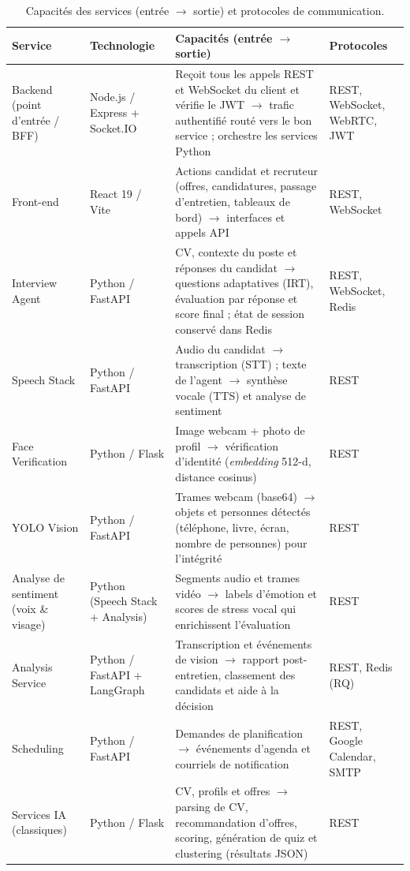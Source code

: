 \begin{table}[H]
  \centering
  \footnotesize
  \setlength{\tabcolsep}{4pt}
  \renewcommand{\arraystretch}{1.35}
  \begin{tabularx}{\textwidth}{|>{\raggedright\arraybackslash}p{2.3cm}|>{\raggedright\arraybackslash}p{2.4cm}|>{\raggedright\arraybackslash}X|>{\raggedright\arraybackslash}p{2.2cm}|}
    \hline
    \textbf{Service} & \textbf{Technologie} & \textbf{Capacités (entrée $\rightarrow$ sortie)} & \textbf{Protocoles} \\
    \hline
    Backend (point d'entrée / BFF) & Node.js / Express + Socket.IO & Reçoit tous les appels REST et WebSocket du client et vérifie le JWT $\rightarrow$ trafic authentifié routé vers le bon service ; orchestre les services Python & REST, WebSocket, WebRTC, JWT \\
    \hline
    Front-end & React 19 / Vite & Actions candidat et recruteur (offres, candidatures, passage d'entretien, tableaux de bord) $\rightarrow$ interfaces et appels API & REST, WebSocket \\
    \hline
    Interview Agent & Python / FastAPI & CV, contexte du poste et réponses du candidat $\rightarrow$ questions adaptatives (IRT), évaluation par réponse et score final ; état de session conservé dans Redis & REST, WebSocket, Redis \\
    \hline
    Speech Stack & Python / FastAPI & Audio du candidat $\rightarrow$ transcription (STT) ; texte de l'agent $\rightarrow$ synthèse vocale (TTS) et analyse de sentiment & REST \\
    \hline
    Face Verification & Python / Flask & Image webcam + photo de profil $\rightarrow$ vérification d'identité (\textit{embedding} 512-d, distance cosinus) & REST \\
    \hline
    YOLO Vision & Python / FastAPI & Trames webcam (base64) $\rightarrow$ objets et personnes détectés (téléphone, livre, écran, nombre de personnes) pour l'intégrité & REST \\
    \hline
    Analyse de sentiment (voix \& visage) & Python (Speech Stack + Analysis) & Segments audio et trames vidéo $\rightarrow$ labels d'émotion et scores de stress vocal qui enrichissent l'évaluation & REST \\
    \hline
    Analysis Service & Python / FastAPI + LangGraph & Transcription et événements de vision $\rightarrow$ rapport post-entretien, classement des candidats et aide à la décision & REST, Redis (RQ) \\
    \hline
    Scheduling & Python / FastAPI & Demandes de planification $\rightarrow$ événements d'agenda et courriels de notification & REST, Google Calendar, SMTP \\
    \hline
    Services IA (classiques) & Python / Flask & CV, profils et offres $\rightarrow$ parsing de CV, recommandation d'offres, scoring, génération de quiz et clustering (résultats JSON) & REST \\
    \hline
  \end{tabularx}
  \caption{Capacités des services (entrée $\rightarrow$ sortie) et protocoles de communication.}
  \label{tab:services}
\end{table}

